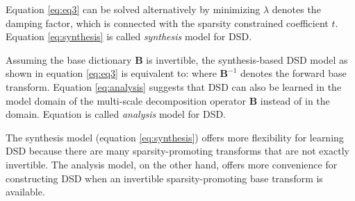 Equation \ref{eq:eq3} can be solved alternatively by minimizing
 $\lambda$ denotes the damping factor, which is connected with the sparsity constrained coefficient $t$. Equation \ref{eq:synthesis} is called \emph{synthesis} model for DSD.

Assuming the base dictionary $\mathbf{B}$ is invertible, the synthesis-based DSD model as shown in equation \ref{eq:eq3} is equivalent to:
where $\mathbf{B}^{-1}$ denotes the forward base transform. Equation \ref{eq:analysis} suggests that DSD can also be learned in the model domain of the multi-scale decomposition operator $\mathbf{B}$ instead of in the  domain. Equation \dlo{\ref{eq:eq9}}\wen{\ref{eq:analysis}} is called \emph{analysis} model for DSD.

The synthesis model (equation \ref{eq:synthesis}) offers more flexibility for learning DSD because there are many sparsity-promoting transforms that are not exactly invertible. The analysis model, on the other hand, offers more convenience for constructing DSD when an invertible sparsity-promoting 
base transform is available. 


